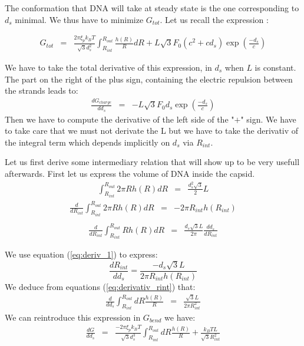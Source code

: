 \documentclass{article}
\begin{document}
The conformation that DNA will take at steady state is the one corresponding to $d_s$ minimal. We thus have to minimize $G_{tot}$. Let us recall the expression :

\begin{eqnarray*}
    G_{tot} &=& \frac{2\pi \xi_p k_B T}{\sqrt{3} d_s^2} \int_{R_{int}}^{R_{out}} \frac{h(R)}{R} dR + L\sqrt{3} F_0 \left(c^2+cd_s \right) \exp{\left(\frac{-d_s}{c}\right)}
\end{eqnarray*}

We have to take the total derivative of this expression, in $d_s$ when $L$ is constant.
The part on the right of the plus sign, containing the electric repulsion between the strands leads to:
\begin{eqnarray}
    \frac{d G_{charge}}{d d_s} &=& - L \sqrt{3} F_0 d_s \exp{\left(\frac{-d_s}{c}\right)}
    \label{eq:deriv_gcharge}
\end{eqnarray}
Then we have to compute the derivative of the left side of the "$+$" sign. We have to take care that we must not derivate the L but we have to take the derivativ of the integral term which depends implicitly on $d_s$ via $R_{int}$.

Let us first derive some intermediary relation that will show up to be very usefull afterwards.
First let us express the volume of DNA inside the capsid.
\begin{eqnarray}
    \int_{R_{int}}^{R_{out}} 2 \pi R h\left( R \right) dR  &=& \frac{d_s^2 \sqrt{3}}{2} L
    \label{eq:L}
\end{eqnarray}
\begin{eqnarray*}
    \frac{d}{d R_{int}} \int_{R_{int}}^{R_{out}} 2 \pi R h\left( R \right) dR &=& - 2 \pi R_{int} h \left( R_{int} \right) \\
\end{eqnarray*}
\begin{eqnarray}
    \frac{d}{d R_{int}} \int_{R_{int}}^{R_{out}} R h\left( R \right) dR &=& \frac{d_s \sqrt{3} L}{2 \pi} \frac{d d_s}{d R_{int}}
    \label{eq:deriv_1}
\end{eqnarray}

 We use equation (\ref{eq:deriv_1}) to express:
 \begin{equation}
     \frac{d R_{int}}{d d_s} = \frac{-d_s \sqrt{3} L}{2 \pi R_{int} h \left( R_{int} \right)}
     \label{eq:derivativ_rint}
 \end{equation}
We deduce from equations (\ref{eq:derivativ_rint}) that:
\begin{eqnarray}
    \frac{d}{d d_s} \int_{R_{int}}^{R_{out}} dR \frac{h(R)}{R} &=&  \frac{\sqrt{3}L}{2\pi R_{int}^2}
\end{eqnarray}
We can reintroduce this expression in $ G_{bend} $ we have:
\begin{eqnarray}
    \frac{d G}{d d_s} &=& \frac{-2\pi \xi_p k_B T}{\sqrt{3} d_s^3} \int_{R_{int}}^{R_{out}} dR \frac{h(R)}{R} + \frac{k_B T L}{\sqrt{3} R_{int}^2}
    \label{eq:deriv_gbend}
\end{eqnarray}
\end{document}
